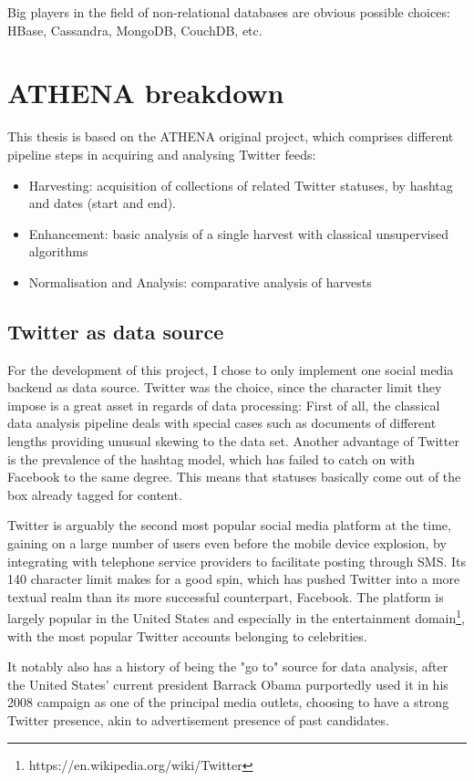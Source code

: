 Big players in the field of non-relational databases are obvious possible choices: HBase, Cassandra, MongoDB, CouchDB, etc.

\section{ATHENA breakdown}
This thesis is based on the ATHENA original project, which comprises different pipeline steps in acquiring and analysing Twitter feeds:

\begin{itemize}
\item Harvesting: acquisition of collections of related Twitter statuses, by hashtag and dates (start and end).
\item Enhancement: basic analysis of a single harvest with classical unsupervised algorithms
\item Normalisation and Analysis: comparative analysis of harvests
\end{itemize}

\subsection{Twitter as data source}
For the development of this project, I chose to only implement one social media backend as data source. Twitter was the choice, since the character limit they impose is a great asset in regards of data processing: First of all, the classical data analysis pipeline deals with special cases such as documents of different lengths providing unusual skewing to the data set. Another advantage of Twitter is the prevalence of the hashtag model, which has failed to catch on with Facebook to the same degree. This means that statuses basically come out of the box already tagged for content.

Twitter is arguably the second most popular social media platform at the time, gaining on a large number of users even before the mobile device explosion, by integrating with telephone service providers to facilitate posting through SMS. Its 140 character limit makes for a good spin, which has pushed Twitter into a more textual realm than its more successful counterpart, Facebook. The platform is largely popular in the United States and especially in the entertainment domain\footnote{https://en.wikipedia.org/wiki/Twitter}, with the most popular Twitter accounts belonging to celebrities.

It notably also has a history of being the "go to" source for data analysis, after the United States' current president Barrack Obama purportedly used it in his 2008 campaign as one of the principal media outlets, choosing to have a strong Twitter presence, akin to advertisement presence of past candidates.

